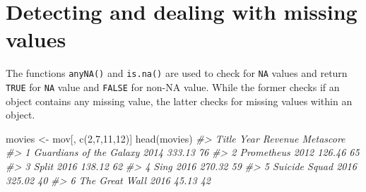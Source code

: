 \documentclass[
]{book}
\newenvironment{Shaded}{\begin{snugshade}}{\end{snugshade}}
\newcommand{\CommentTok}[1]{\textcolor[rgb]{0.56,0.35,0.01}{\textit{#1}}}
\newcommand{\DecValTok}[1]{\textcolor[rgb]{0.00,0.00,0.81}{#1}}
\newcommand{\FunctionTok}[1]{\textcolor[rgb]{0.00,0.00,0.00}{#1}}
\newcommand{\NormalTok}[1]{#1}
\newcommand{\OtherTok}[1]{\textcolor[rgb]{0.56,0.35,0.01}{#1}}
\begin{document}
\hypertarget{detecting-and-dealing-with-missing-values}{%
\section{Detecting and dealing with missing values}\label{detecting-and-dealing-with-missing-values}}

The functions \texttt{anyNA()} and \texttt{is.na()} are used to check for \texttt{NA} values and return \texttt{TRUE} for \texttt{NA} value and \texttt{FALSE} for non-NA value. While the former checks if an object contains any missing value, the latter checks for missing values within an object.

\begin{Shaded}
\begin{Highlighting}[]
\NormalTok{movies }\OtherTok{\textless{}{-}}\NormalTok{ mov[, }\FunctionTok{c}\NormalTok{(}\DecValTok{2}\NormalTok{,}\DecValTok{7}\NormalTok{,}\DecValTok{11}\NormalTok{,}\DecValTok{12}\NormalTok{)]}
\FunctionTok{head}\NormalTok{(movies)}
\CommentTok{\#\textgreater{}                     Title Year Revenue Metascore}
\CommentTok{\#\textgreater{} 1 Guardians of the Galaxy 2014  333.13        76}
\CommentTok{\#\textgreater{} 2              Prometheus 2012  126.46        65}
\CommentTok{\#\textgreater{} 3                   Split 2016  138.12        62}
\CommentTok{\#\textgreater{} 4                    Sing 2016  270.32        59}
\CommentTok{\#\textgreater{} 5           Suicide Squad 2016  325.02        40}
\CommentTok{\#\textgreater{} 6          The Great Wall 2016   45.13        42}


\end{Highlighting}
\end{Shaded}
\end{document}
